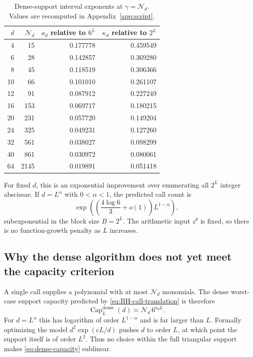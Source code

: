 \documentclass[11pt,oneside]{article}
\theoremstyle{definition}
\theoremstyle{remark}
\newcommand{\tht}{\theta}
\newcommand{\Nm}{\mathcal N}
\begin{document}
\begin{table}[ht]
\centering
\small
\begin{tabular}{rrrr}
\toprule
$d$ & $\Nm_d$ & $a_d$ relative to $6^L$ & $\kappa_d$ relative to $2^L$ \\
\midrule
4  & 15   & 0.177778 & 0.459549 \\
6  & 28   & 0.142857 & 0.369280 \\
8  & 45   & 0.118519 & 0.306366 \\
10 & 66   & 0.101010 & 0.261107 \\
12 & 91   & 0.087912 & 0.227249 \\
16 & 153  & 0.069717 & 0.180215 \\
20 & 231  & 0.057720 & 0.149204 \\
24 & 325  & 0.049231 & 0.127260 \\
32 & 561  & 0.038027 & 0.098299 \\
40 & 861  & 0.030972 & 0.080061 \\
64 & 2145 & 0.019891 & 0.051418 \\
\bottomrule
\end{tabular}
\caption{Dense-support interval exponents at $\gamma=\Nm_d$.  Values are recomputed in
Appendix~\ref{app:script}.}
\label{tab:BH-exponents}
\end{table}

For fixed $d$, this is an exponential improvement over enumerating all $2^L$ integer abscissae.
If $d=L^\alpha$ with $0<\alpha<1$, the predicted call count is
\begin{equation}
  \exp\!\left(\left(\frac{4\log6}{3}+o(1)\right)L^{1-\alpha}\right),
  \label{eq:BH-subexponential}
\end{equation}
subexponential in the block size $B=2^L$.  The arithmetic input $z^\tht$ is fixed, so there is no
function-growth penalty as $L$ increases.

\subsection{Why the dense algorithm does not yet meet the capacity criterion}

A single call supplies a polynomial with at most $\Nm_d$ monomials.  The dense worst-case support
capacity predicted by \eqref{eq:BH-call-translation} is therefore
\begin{equation}
  \operatorname{Cap}^{\mathrm{dense}}_L(d)
  \asymp \Nm_d\,6^{a_dL}.
  \label{eq:dense-capacity}
\end{equation}
For $d=L^\alpha$ this has logarithm of order $L^{1-\alpha}$ and is far larger than $L$.  Formally
optimizing the model $d^2\exp(cL/d)$ pushes $d$ to order $L$, at which point the support itself is
of order $L^2$.  Thus no choice within the full triangular support makes
\eqref{eq:dense-capacity} sublinear.
\end{document}
